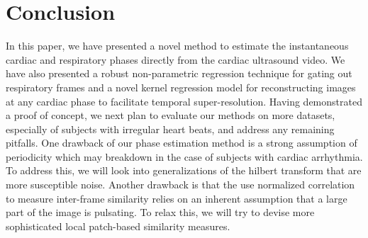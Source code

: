 \documentclass[runningheads,a4paper]{llncs}
\begin{document}
%
%
\vspace{-0.3cm}
\section{Conclusion}
\label{sec:conclusion}
%
In this paper, we have presented a novel method to estimate the instantaneous cardiac and respiratory phases directly from the cardiac ultrasound video. We have also presented a robust non-parametric regression technique for gating out respiratory frames and a novel kernel regression model for reconstructing images at any cardiac phase to facilitate temporal super-resolution. Having demonstrated a proof of concept, we next plan to evaluate our methods on more datasets, especially of subjects with irregular heart beats, and address any remaining pitfalls. One drawback of our phase estimation method is a strong assumption of periodicity which may breakdown in the case of subjects with cardiac arrhythmia. To address this, we will look into generalizations of the hilbert transform\cite{Lu2013} that are more susceptible noise. Another drawback is that the use normalized correlation to measure inter-frame similarity relies on an inherent assumption that a large part of the image is pulsating. To relax this, we will try to devise more sophisticated local patch-based similarity measures.
%
\vspace{-0.3cm}


\end{document}
